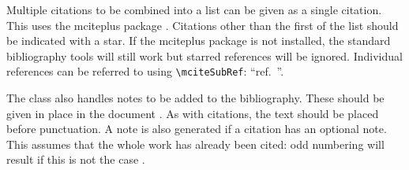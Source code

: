 Multiple citations to be combined into a list can be given as
a single citation.  This uses the \textsf{mciteplus} package
\cite{Johnson1972,*Arduengo1992,*Eisenstein2005,*Arduengo1994}.
Citations other than the first of the list should be indicated
with a star. If the \textsf{mciteplus} package is not installed,
the standard bibliography tools will still work but starred
references will be ignored. Individual references can be referred
to using \texttt{\textbackslash mciteSubRef}:
``ref.~''.

The class also handles notes to be added to the bibliography.  These
should be given in place in the document .  As with
citations, the text should be placed before punctuation.  A note is
also generated if a citation has an optional note.  This assumes that
the whole work has already been cited: odd numbering will result if
this is not the case \cite[p.~1]{Cotton1999}.




